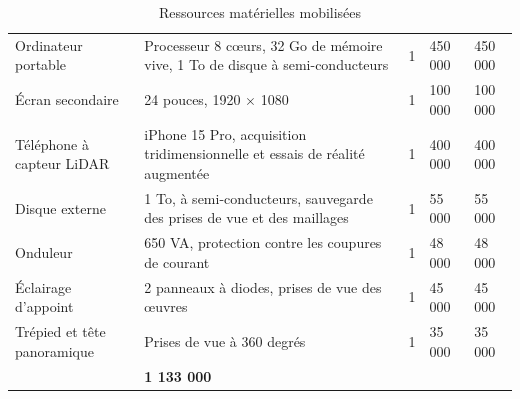 \begin{table}[!ht]
\centering
\caption{Ressources matérielles mobilisées}
\label{tab:materiel}
\small
\begin{tabularx}{\textwidth}{|L{3.2cm}|X|C{1.3cm}|R{2.0cm}|R{2.0cm}|}
\hline
{}
 &  &  &  &  \\ \hline
Ordinateur portable & Processeur 8 cœurs, 32 Go de mémoire vive, 1 To de disque à semi-conducteurs & 1 & 450 000 & 450 000 \\ \hline
Écran secondaire & 24 pouces, 1920 $\times$ 1080 & 1 & 100 000 & 100 000 \\ \hline
Téléphone à capteur LiDAR & iPhone 15 Pro, acquisition tridimensionnelle et essais de réalité augmentée & 1 & 400 000 & 400 000 \\ \hline
Disque externe & 1 To, à semi-conducteurs, sauvegarde des prises de vue et des maillages & 1 & 55 000 & 55 000 \\ \hline
Onduleur & 650 VA, protection contre les coupures de courant & 1 & 48 000 & 48 000 \\ \hline
Éclairage d'appoint & 2 panneaux à diodes, prises de vue des œuvres & 1 & 45 000 & 45 000 \\ \hline
Trépied et tête panoramique & Prises de vue à 360 degrés & 1 & 35 000 & 35 000 \\ \hline
{}
 & \textbf{1 133 000} \\ \hline
\end{tabularx}
\end{table}

